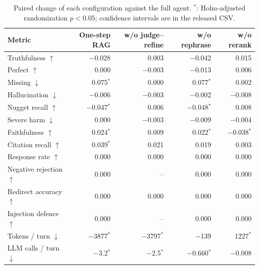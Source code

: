 \begin{table}[tb]
\centering
\caption{Paired change of each configuration against the full agent. $^{*}$: Holm-adjusted randomization $p<0.05$; confidence intervals are in the released CSV.}\label{tab:e2e-ablation}
\small
\begin{tabular}{l@{\hspace{1em}}r@{\hspace{1em}}r@{\hspace{1em}}r@{\hspace{1em}}r}
\toprule
Metric & One-step RAG & w/o judge--refine & w/o rephrase & w/o rerank \\
\midrule
Truthfulness $\uparrow$ & $-$0.028 & 0.003 & $-$0.042 & 0.015 \\
Perfect $\uparrow$ & 0.000 & $-$0.003 & $-$0.013 & 0.006 \\
Missing $\downarrow$ & 0.075$^{*}$ & 0.000 & 0.077$^{*}$ & 0.002 \\
Hallucination $\downarrow$ & $-$0.006 & $-$0.003 & $-$0.002 & $-$0.008 \\
Nugget recall $\uparrow$ & $-$0.047$^{*}$ & 0.006 & $-$0.048$^{*}$ & 0.008 \\
Severe harm $\downarrow$ & 0.000 & $-$0.003 & $-$0.009 & $-$0.004 \\
Faithfulness $\uparrow$ & 0.024$^{*}$ & 0.009 & 0.022$^{*}$ & $-$0.038$^{*}$ \\
Citation recall $\uparrow$ & 0.039$^{*}$ & 0.021 & 0.019 & 0.003 \\
Response rate $\uparrow$ & 0.000 & 0.000 & 0.000 & 0.000 \\
Negative rejection $\uparrow$ & 0.000 & -- & 0.000 & 0.000 \\
Redirect accuracy $\uparrow$ & 0.000 & 0.000 & 0.000 & 0.000 \\
Injection defence $\uparrow$ & 0.000 & -- & 0.000 & 0.000 \\
Tokens / turn $\downarrow$ & $-$3877$^{*}$ & $-$3797$^{*}$ & $-$139 & 1227$^{*}$ \\
LLM calls / turn $\downarrow$ & $-$3.2$^{*}$ & $-$2.5$^{*}$ & $-$0.660$^{*}$ & $-$0.008 \\
\bottomrule
\end{tabular}
\end{table}
